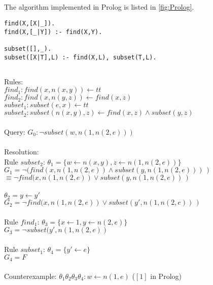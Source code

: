 \documentclass[]{article}
\begin{document}
\subsection{}
The algorithm implemented in Prolog is listed in \ref{fig:Prolog}.
\begin{lstlisting}[frame=single,caption={The code for $subset(L1,L2)$ in Prolog}]
find(X,[X|_]).
find(X,[_|Y]) :- find(X,Y).

subset([],_).
subset([X|T],L) :- find(X,L), subset(T,L).
\end{lstlisting}
\label{fig:Prolog}
\subsection{}
Rules:\\
$find_1: find(x,n(x,y)) \leftarrow tt$\\
$find_2: find(x,n(y,z)) \leftarrow find(x,z)$\\
$subset_1: subset(e,x) \leftarrow tt$\\
$subset_2: subset(n(x,y), z) \leftarrow find(x,z)  \wedge subset(y,z)$\\\\
Query: $G_0:\neg subset(w,n(1,n(2,e)))$\\ \\
Resolution:\\
Rule $subset_2$: $\theta_1= \{w\leftarrow n(x,y), z\leftarrow n(1,n(2,e))\}$\\
$G_1 = \neg(find(x,n(1,n(2,e)) \wedge subset(y,n(1,n(2,e)))\hspace{2pt})$\\
$\equiv \neg find(x,n(1,n(2,e)) \vee subset(y,n(1,n(2,e))\hspace{2pt})$\\ \\
$\theta_2= y \leftarrow y'$\\
$G_2 = \neg find(x,n(1,n(2,e)) \vee subset(y',n(1,n(2,e))\hspace{2pt})$\\ \\
Rule $find_1$: $\theta_3= \{x\leftarrow 1, y\leftarrow n(2,e)\}$\\
$G_3 = \neg subset(y',n(1,n(2,e))$ \\ \\
Rule $subset_1$: $\theta_4= \{y' \leftarrow e\}$\\
$G_4 = F $\\ \\
Counterexample: $\theta_1\theta_2\theta_3\theta_4: w \leftarrow n(1,e) $ ($[1]$ in Prolog)

\subsection{}
\end{document}
